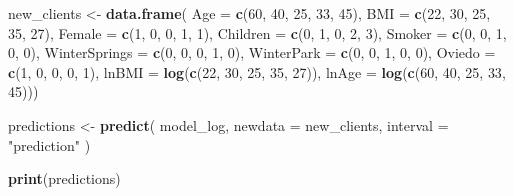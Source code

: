 \documentclass[
]{article}
\newenvironment{Shaded}{\begin{snugshade}}{\end{snugshade}}
\newcommand{\AttributeTok}[1]{\textcolor[rgb]{0.13,0.29,0.53}{#1}}
\newcommand{\DecValTok}[1]{\textcolor[rgb]{0.00,0.00,0.81}{#1}}
\newcommand{\FunctionTok}[1]{\textcolor[rgb]{0.13,0.29,0.53}{\textbf{#1}}}
\newcommand{\NormalTok}[1]{#1}
\newcommand{\OtherTok}[1]{\textcolor[rgb]{0.56,0.35,0.01}{#1}}
\newcommand{\StringTok}[1]{\textcolor[rgb]{0.31,0.60,0.02}{#1}}
\begin{document}
\begin{Shaded}
\begin{Highlighting}[]
\NormalTok{new\_clients }\OtherTok{\textless{}{-}} \FunctionTok{data.frame}\NormalTok{(}
  \AttributeTok{Age =} \FunctionTok{c}\NormalTok{(}\DecValTok{60}\NormalTok{, }\DecValTok{40}\NormalTok{, }\DecValTok{25}\NormalTok{, }\DecValTok{33}\NormalTok{, }\DecValTok{45}\NormalTok{),}
  \AttributeTok{BMI =} \FunctionTok{c}\NormalTok{(}\DecValTok{22}\NormalTok{, }\DecValTok{30}\NormalTok{, }\DecValTok{25}\NormalTok{, }\DecValTok{35}\NormalTok{, }\DecValTok{27}\NormalTok{),}
  \AttributeTok{Female =} \FunctionTok{c}\NormalTok{(}\DecValTok{1}\NormalTok{, }\DecValTok{0}\NormalTok{, }\DecValTok{0}\NormalTok{, }\DecValTok{1}\NormalTok{, }\DecValTok{1}\NormalTok{),}
  \AttributeTok{Children =} \FunctionTok{c}\NormalTok{(}\DecValTok{0}\NormalTok{, }\DecValTok{1}\NormalTok{, }\DecValTok{0}\NormalTok{, }\DecValTok{2}\NormalTok{, }\DecValTok{3}\NormalTok{),}
  \AttributeTok{Smoker =} \FunctionTok{c}\NormalTok{(}\DecValTok{0}\NormalTok{, }\DecValTok{0}\NormalTok{, }\DecValTok{1}\NormalTok{, }\DecValTok{0}\NormalTok{, }\DecValTok{0}\NormalTok{),}
  \AttributeTok{WinterSprings =} \FunctionTok{c}\NormalTok{(}\DecValTok{0}\NormalTok{, }\DecValTok{0}\NormalTok{, }\DecValTok{0}\NormalTok{, }\DecValTok{1}\NormalTok{, }\DecValTok{0}\NormalTok{),}
  \AttributeTok{WinterPark =} \FunctionTok{c}\NormalTok{(}\DecValTok{0}\NormalTok{, }\DecValTok{0}\NormalTok{, }\DecValTok{1}\NormalTok{, }\DecValTok{0}\NormalTok{, }\DecValTok{0}\NormalTok{),}
  \AttributeTok{Oviedo =} \FunctionTok{c}\NormalTok{(}\DecValTok{1}\NormalTok{, }\DecValTok{0}\NormalTok{, }\DecValTok{0}\NormalTok{, }\DecValTok{0}\NormalTok{, }\DecValTok{1}\NormalTok{),}
  \AttributeTok{lnBMI =} \FunctionTok{log}\NormalTok{(}\FunctionTok{c}\NormalTok{(}\DecValTok{22}\NormalTok{, }\DecValTok{30}\NormalTok{, }\DecValTok{25}\NormalTok{, }\DecValTok{35}\NormalTok{, }\DecValTok{27}\NormalTok{)),}
  \AttributeTok{lnAge =} \FunctionTok{log}\NormalTok{(}\FunctionTok{c}\NormalTok{(}\DecValTok{60}\NormalTok{, }\DecValTok{40}\NormalTok{, }\DecValTok{25}\NormalTok{, }\DecValTok{33}\NormalTok{, }\DecValTok{45}\NormalTok{)))}
  
\NormalTok{  predictions }\OtherTok{\textless{}{-}} \FunctionTok{predict}\NormalTok{(}
\NormalTok{  model\_log,}
  \AttributeTok{newdata =}\NormalTok{ new\_clients,}
  \AttributeTok{interval =} \StringTok{"prediction"}
\NormalTok{  )}
  
\FunctionTok{print}\NormalTok{(predictions)}
\end{Highlighting}
\end{Shaded}
\end{document}
